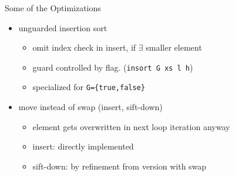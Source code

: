 \documentclass[fleqn]{beamer}
\newcommand{\isai}{\lstinline[language=isabelle,basicstyle=\normalsize\ttfamily\slshape]}
\begin{document}
\begin{frame}[t,fragile]{Some of the Optimizations}

  \begin{itemize}
   \item<2-> unguarded insertion sort
    \begin{itemize}
     \item omit index check in insert, if $\exists$ smaller element
     \item guard controlled by flag. (\isai{insort G xs l h})
     \item specialized for \isai$G={true,false}$

    \end{itemize}
   \item<3-> move instead of swap (insert, sift-down)
    \begin{itemize}
     \item element gets overwritten in next loop iteration anyway
     \item insert: directly implemented
     \item sift-down: by refinement from version with swap

    \end{itemize}
  \end{itemize}

\end{frame}
\end{document}
